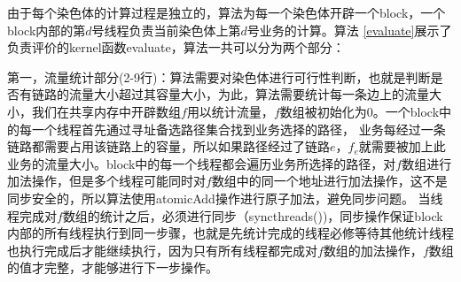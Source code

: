 由于每个染色体的计算过程是独立的，算法为每一个染色体开辟一个block，一个block内部的第$d$号线程负责当前染色体上第$d$号业务的计算。算法 \ref{evaluate}展示了负责评价的kernel函数evaluate，算法一共可以分为两个部分：

第一，流量统计部分(2-9行)：算法需要对染色体进行可行性判断，也就是判断是否有链路的流量大小超过其容量大小，为此，算法需要统计每一条边上的流量大小，我们在共享内存中开辟数组$f$用以统计流量，$f$数组被初始化为0。一个block中的每一个线程首先通过寻址备选路径集合找到业务选择的路径，
业务每经过一条链路都需要占用该链路上的容量，所以如果路径经过了链路$e$，$f_e$就需要被加上此业务的流量大小。block中的每一个线程都会遍历业务所选择的路径，对$f$数组进行加法操作，但是多个线程可能同时对$f$数组中的同一个地址进行加法操作，这不是同步安全的，所以算法使用atomicAdd操作进行原子加法，避免同步问题。
当线程完成对$f$数组的统计之后，必须进行同步（syncthreads())，同步操作保证block内部的所有线程执行到同一步骤，也就是先统计完成的线程必修等待其他统计线程也执行完成后才能继续执行，因为只有所有线程都完成对$f$数组的加法操作，$f$数组的值才完整，才能够进行下一步操作。


